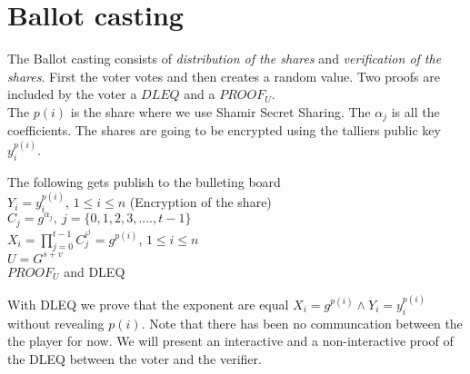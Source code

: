 \section{Ballot casting}
The  Ballot casting consists of \textit{distribution of the shares} and \textit{verification of the shares}. First the voter votes and then creates a random value. Two proofs are included by the voter a $DLEQ$ and a $PROOF_U$.\\

 The \begin{math}p(i)\end{math} is the share where we use Shamir Secret Sharing. The \begin{math}\alpha_j\end{math} is all the coefficients. The shares are going to be encrypted using the talliers public key $y_i^{p(i)}$. \\


\begin{infobox}
The following gets publish to the bulleting board\\
\begin{math}Y_i=y_i^{p(i)} \end{math}, \begin{math}1\leq i\leq n\end{math} (Encryption of the share) \\ 
\begin{math}C_j=g^{\alpha_j},\ j=\{0,1,2,3,....,t-1 \} \end{math} \\ 
\begin{math}X_i=\prod\limits_{j=0}^{t-1} C_j^{i^j} =g^{p(i)}\end{math}, \begin{math}1\leq i\leq n\end{math}\\
\begin{math}U=G^{s+v} \end{math}\\
\begin{math}PROOF_U \end{math} and DLEQ
\end{infobox}

 With DLEQ we prove that the exponent are equal \begin{math}X_i=g^{p(i)}  \land Y_i=y_i^{p(i)} \end{math} without revealing \begin{math}{p(i)} \end{math}. Note that there has been no communcation between the the player for now. We will present an interactive and a non-interactive proof of the DLEQ between the voter and the verifier.\\

